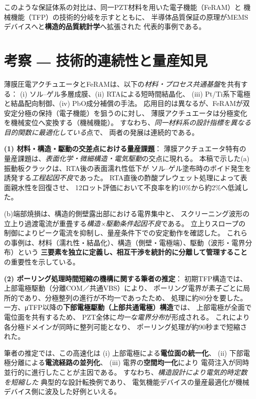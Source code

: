 \documentclass[conference]{IEEEtran}
\begin{document}
\medskip
このような保証体系の対比は、同一PZT材料を用いた電子機能（FeRAM）と
機械機能（TFP）の技術的分岐を示すとともに、
半導体品質保証の原理がMEMSデバイスへと\textbf{構造的品質統計学}へ拡張された
代表的事例である。

\section{考察 ― 技術的連続性と量産知見}
薄膜圧電アクチュエータとFeRAMは、以下の\emph{材料・プロセス共通基盤}を共有する：
(i) ソル–ゲル多層成膜、(ii) RTAによる短時間結晶化、
(iii) Pt/Ti系下電極と結晶配向制御、(iv) PbO成分補償の手法\cite{bottaro1993solgel,scott2000review,damjanovic2010ferro}。
応用目的は異なるが、FeRAMが双安定分極の保持（電子機能）を狙うのに対し、
薄膜アクチュエータは分極変化を機械変位へ変換する（機械機能）。
すなわち、\emph{同一材料系の設計指標を異なる目的関数に最適化している}点で、
両者の発展は連続的である。

\medskip
\noindent
\textbf{(1) 材料・構造・駆動の交差点における量産課題}：
薄膜アクチュエータ特有の量産課題は、\emph{表面化学・微細構造・電気駆動}の交点に現れる。
本稿で示した(a)振動板クラックは、RTA後の表面濡れ性低下が
ソル–ゲル塗布時のボイド発生を誘発する\emph{工程起因不良}であった。
RTA直後の酢酸プレウェット処理によって表面親水性を回復させ、
12ロット評価において不良率を約10\%から約2\%へ低減した。

(b)端部焼損は、構造的側壁露出部における電界集中と、
スクリーニング波形の立上り過渡電流が重畳する\emph{構造×駆動条件起因不良}である。
立上りスロープの制御によりピーク電流を抑制し、量産条件下での安定動作を確認した。
これらの事例は、材料（濡れ性・結晶化）、構造（側壁・電極端）、駆動（波形・電界分布）という
\textbf{三要素を独立に定義し、相互干渉を統計的に分離して管理すること}の重要性を示している。

\medskip
\noindent
\textbf{(2) ポーリング処理時間短縮の機構に関する筆者の推定}：
初期TFP構造では、上部電極駆動（分離COM／共通VBS）により、
ポーリング電界が素子ごとに局所的であり、分極整列の進行が不均一であったため、
処理に約80分を要した。
一方、μTFP以降の\textbf{下部電極駆動（上部共通電極）構造}では、
上部電極が全面で電位面を共有するため、
PZT全体に\emph{均一な電界分布}が形成される。
これにより各分極ドメインが同時に整列可能となり、
ポーリング処理が約90秒まで短縮された。

筆者の推定では、この高速化は
(i) 上部電極による\textbf{電位面の統一化}、
(ii) 下部電極分離による\textbf{電流経路の並列化}、
(iii) 電界の\textbf{空間均一化}により
電荷注入が同時並行的に進行したことが主因である。
すなわち、\emph{構造設計により電気的時定数を短縮した}
典型的な設計転換例であり、
電気機能デバイスの量産最適化が機械デバイス側に波及した好例といえる。
\end{document}
